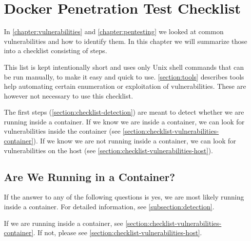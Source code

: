 \chapter{Docker Penetration Test Checklist}\label{chapter:checklist}
In \autoref{chapter:vulnerabilities} and \autoref{chapter:pentesting} we looked at common vulnerabilities and how to identify them. In this chapter we will summarize those into a checklist consisting of steps.

This list is kept intentionally short and uses only Unix shell commands that can be run manually, to make it easy and quick to use. \autoref{section:tools} describes tools help automating certain enumeration or exploitation of vulnerabilities. These are however not necessary to use this checklist.

\medskip

The first steps (\autoref{section:checklist-detection}) are meant to detect whether we are running inside a container. If we know we are inside a container, we can look for vulnerabilities inside the container (see \autoref{section:checklist-vulnerabilities-container}). If we know we are not running inside a container, we can look for vulnerabilities on the host (see \autoref{section:checklist-vulnerabilities-host}).

\section{Are We Running in a Container?}\label{section:checklist-detection}
If the answer to any of the following questions is yes, we are most likely running inside a container. For detailed information, see \autoref{subsection:detection}.

\medskip

If we are running inside a container, see \autoref{section:checklist-vulnerabilities-container}. If not, please see \autoref{section:checklist-vulnerabilities-host}.


